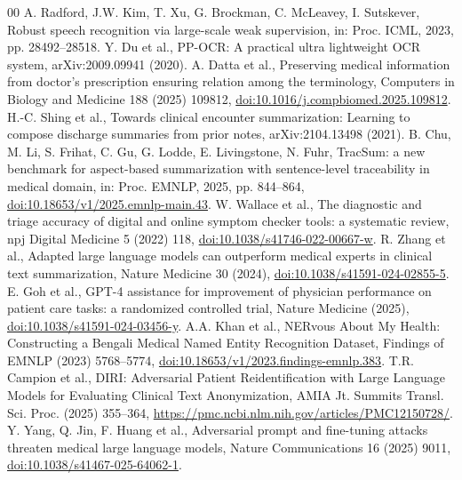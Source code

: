 \documentclass[preprint,12pt,a4paper]{elsarticle}
\begin{document}
\begin{thebibliography}{00}
 A. Radford, J.W. Kim, T. Xu, G. Brockman, C. McLeavey, I. Sutskever, Robust speech recognition via large-scale weak supervision, in: Proc. ICML, 2023, pp. 28492--28518.
 Y. Du et al., PP-OCR: A practical ultra lightweight OCR system, arXiv:2009.09941 (2020).
 A. Datta et al., Preserving medical information from doctor's prescription ensuring relation among the terminology, Computers in Biology and Medicine 188 (2025) 109812, \href{https://doi.org/10.1016/j.compbiomed.2025.109812}{doi:10.1016/j.compbiomed.2025.109812}.
 H.-C. Shing et al., Towards clinical encounter summarization: Learning to compose discharge summaries from prior notes, arXiv:2104.13498 (2021).
 B. Chu, M. Li, S. Frihat, C. Gu, G. Lodde, E. Livingstone, N. Fuhr, TracSum: a new benchmark for aspect-based summarization with sentence-level traceability in medical domain, in: Proc. EMNLP, 2025, pp. 844--864, \href{https://doi.org/10.18653/v1/2025.emnlp-main.43}{doi:10.18653/v1/2025.emnlp-main.43}.
 W. Wallace et al., The diagnostic and triage accuracy of digital and online symptom checker tools: a systematic review, npj Digital Medicine 5 (2022) 118, \href{https://doi.org/10.1038/s41746-022-00667-w}{doi:10.1038/s41746-022-00667-w}.
 R. Zhang et al., Adapted large language models can outperform medical experts in clinical text summarization, Nature Medicine 30 (2024), \href{https://doi.org/10.1038/s41591-024-02855-5}{doi:10.1038/s41591-024-02855-5}.
 E. Goh et al., GPT-4 assistance for improvement of physician performance on patient care tasks: a randomized controlled trial, Nature Medicine (2025), \href{https://doi.org/10.1038/s41591-024-03456-y}{doi:10.1038/s41591-024-03456-y}.
 A.A. Khan et al., NERvous About My Health: Constructing a Bengali Medical Named Entity Recognition Dataset, Findings of EMNLP (2023) 5768--5774, \href{https://doi.org/10.18653/v1/2023.findings-emnlp.383}{doi:10.18653/v1/2023.findings-emnlp.383}.
 T.R. Campion et al., DIRI: Adversarial Patient Reidentification with Large Language Models for Evaluating Clinical Text Anonymization, AMIA Jt. Summits Transl. Sci. Proc. (2025) 355--364, \url{https://pmc.ncbi.nlm.nih.gov/articles/PMC12150728/}.
 Y. Yang, Q. Jin, F. Huang et al., Adversarial prompt and fine-tuning attacks threaten medical large language models, Nature Communications 16 (2025) 9011, \href{https://doi.org/10.1038/s41467-025-64062-1}{doi:10.1038/s41467-025-64062-1}.

\end{thebibliography}
\end{document}
